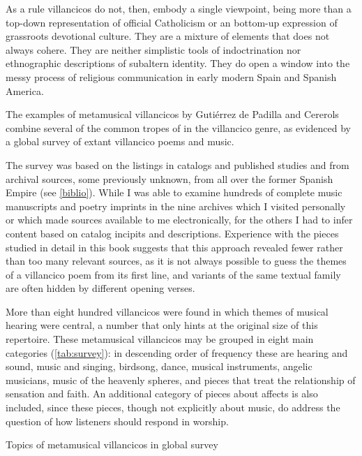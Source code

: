 As a rule villancicos do not, then, embody a single viewpoint, being more than
a top-down representation of official Catholicism or an bottom-up expression of
grassroots devotional culture.
They are a mixture of elements that does not always cohere.
They are neither simplistic tools of indoctrination nor ethnographic
descriptions of subaltern identity.
They do open a window into the messy process of religious communication in
early modern Spain and Spanish America.

The examples of metamusical villancicos by Gutiérrez de Padilla and Cererols
combine several of the common tropes of  in the
villancico genre, as evidenced by a global survey of extant villancico poems
and music.%
\begin{Footnote}
    The survey was based on the listings in catalogs and published studies and
    from archival sources, some previously unknown, from all over the former
    Spanish Empire (see \cref{biblio}).
    While I was able to examine hundreds of complete music manuscripts and
    poetry imprints in the nine archives which I visited personally or which
    made sources available to me electronically, for the others I had to infer
    content based on catalog incipits and descriptions.
    Experience with the pieces studied in detail in this book suggests that
    this approach revealed fewer rather than too many relevant sources, as it
    is not always possible to guess the themes of a villancico poem from its
    first line, and variants of the same textual family are often hidden by
    different opening verses.
\end{Footnote}
More than eight hundred villancicos were found in which themes of musical
hearing were central, a number that only hints at the original size of this
repertoire.
These metamusical villancicos may be grouped in eight main categories
(\cref{tab:survey}): in descending order of frequency these are hearing and
sound, music and singing, birdsong, dance, musical instruments, angelic
musicians, music of the heavenly spheres, and pieces that treat the
relationship of sensation and faith.
An additional category of pieces about affects is also included, since these
pieces, though not explicitly about music, do address the question of how
listeners should respond in worship. 

{Topics of metamusical villancicos in global survey}

